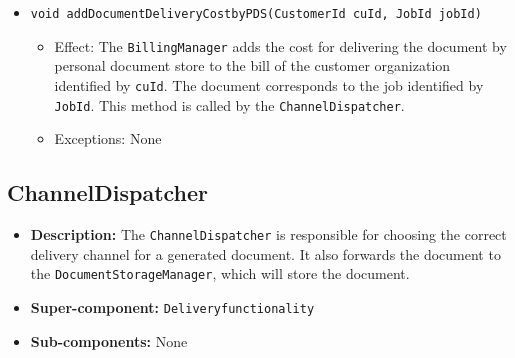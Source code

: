 \documentclass[a4paper,10pt]{article}
\begin{document}
\begin{itemize}
\begin{itemize}
		\item \texttt{void addDocumentDeliveryCostbyPDS(CustomerId cuId, JobId jobId)}       
        \begin{itemize}
            \item Effect: The \texttt{BillingManager} adds the cost for delivering the document by personal document store to the bill of the customer organization identified by \texttt{cuId}. The document corresponds to the job identified by \texttt{JobId}. This method is called by the \texttt{ChannelDispatcher}.
            \item Exceptions: None
        \end{itemize}          
        
                     
    \end{itemize}
\end{itemize}

\subsection{ChannelDispatcher}
\begin{itemize}
    \item \textbf{Description:} The \texttt{ChannelDispatcher} is responsible for choosing the correct delivery channel for a generated document. It also forwards the document to the \texttt{DocumentStorageManager}, which will store the document.
    \item \textbf{Super-component:} \texttt{Deliveryfunctionality}
    \item \textbf{Sub-components:} None
\end{itemize}
\end{document}
